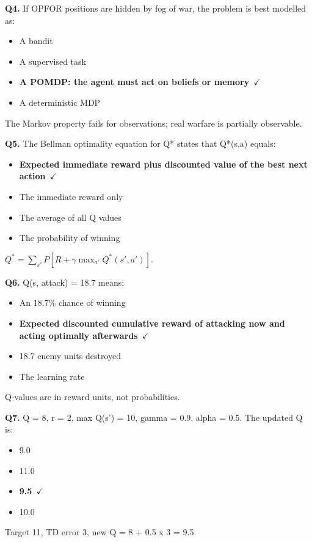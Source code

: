 \documentclass[11pt]{article}
\begin{document}
{\noindent\textbf{Q4.} If OPFOR positions are hidden by fog of war, the problem is best modelled as:\begin{itemize}[leftmargin=2.2em,itemsep=0pt,topsep=1pt]\item[A.] A bandit\item[B.] A supervised task\item[\textbf{C.}] \textbf{A POMDP: the agent must act on beliefs or memory}~{\color{GrnN}$\checkmark$}\item[D.] A deterministic MDP\end{itemize} The Markov property fails for observations; real warfare is partially observable.\par\medskip

\noindent\textbf{Q5.} The Bellman optimality equation for Q* states that Q*(s,a) equals:\begin{itemize}[leftmargin=2.2em,itemsep=0pt,topsep=1pt]\item[\textbf{A.}] \textbf{Expected immediate reward plus discounted value of the best next action}~{\color{GrnN}$\checkmark$}\item[B.] The immediate reward only\item[C.] The average of all Q values\item[D.] The probability of winning\end{itemize} $Q^*=\sum_{s'}P[R+\gamma\max_{a'}Q^*(s',a')]$.\par\medskip

\noindent\textbf{Q6.} Q(s, attack) = 18.7 means:\begin{itemize}[leftmargin=2.2em,itemsep=0pt,topsep=1pt]\item[A.] An 18.7\% chance of winning\item[\textbf{B.}] \textbf{Expected discounted cumulative reward of attacking now and acting optimally afterwards}~{\color{GrnN}$\checkmark$}\item[C.] 18.7 enemy units destroyed\item[D.] The learning rate\end{itemize} Q-values are in reward units, not probabilities.\par\medskip

\noindent\textbf{Q7.} Q = 8, r = 2, max Q(s') = 10, gamma = 0.9, alpha = 0.5. The updated Q is:\begin{itemize}[leftmargin=2.2em,itemsep=0pt,topsep=1pt]\item[A.] 9.0\item[B.] 11.0\item[\textbf{C.}] \textbf{9.5}~{\color{GrnN}$\checkmark$}\item[D.] 10.0\end{itemize} Target 11, TD error 3, new Q = 8 + 0.5 x 3 = 9.5.\par\medskip

}
\end{document}
